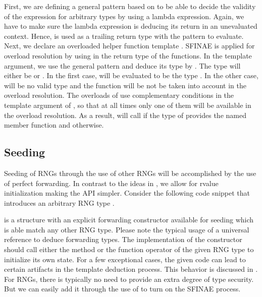 \documentclass{stdlocal}
\begin{document}
    First, we are defining a general pattern  based on  to be able to decide the validity of the expression  for arbitrary types by using a lambda expression.
    Again, we have to make sure the lambda expression is deducing its return in an unevaluated context.
    Hence,  is used as a trailing return type with the pattern to evaluate.
    Next, we declare an overloaded helper function template .
    SFINAE is applied for overload resolution by using  in the return type of the functions.
    In the template argument, we use the general pattern  and deduce its type by .
    The type will either be  or .
    In the first case,  will be evaluated to be the type .
    In the other case,  will be no valid type and the function will be not be taken into account in the overload resolution.
    The overloads of  use complementary conditions in the template argument of , so that at all times only one of them will be available in the overload resolution.
    As a result,  will call  if the type of  provides the named member function and  otherwise.

  \subsection{Seeding} %
  \label{sub:seeding}
    Seeding of RNGs through the use of other RNGs will be accomplished by the use of perfect forwarding.
    In contrast to the ideas in \textcite{cpp-std-seeding}, we allow for rvalue initialization making the API simpler.
    Consider the following code snippet that introduces an arbitrary RNG type .

     is a structure with an explicit forwarding constructor available for seeding which is able match any other RNG type.
    Please note the typical usage of a universal reference to deduce forwarding types.
    The implementation of the constructor should call either the  method or the function operator of the given RNG type to initialize its own state.
    For a few exceptional cases, the given code can lead to certain artifacts in the template deduction process.
    This behavior is discussed in \textcite[\ppno~188-197]{meyers2014}.
    For RNGs, there is typically no need to provide an extra degree of type security.
    But we can easily add it through the use of  to turn on the SFINAE process.
\end{document}
